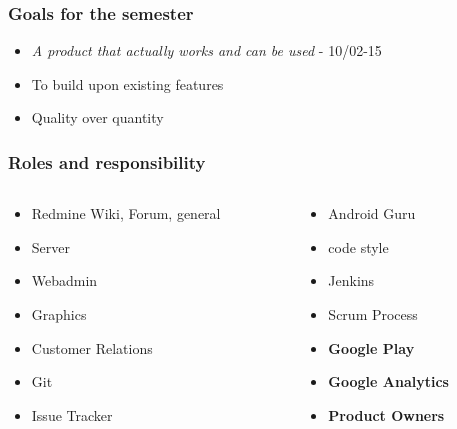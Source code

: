 \begin{frame}
	\begin{center}
		\frametitle{Goals for the semester}
		\begin{itemize}
			\item \textit{A product that actually works and can be used} - 10/02-15
			\item To build upon existing features
			\item Quality over quantity
		\end{itemize}
	\end{center}
\end{frame}

\begin{frame}
	\frametitle{Roles and responsibility}
	\begin{columns}[T] %
		\begin{column}{.48\textwidth}
			\begin{itemize}
				\item Redmine Wiki, Forum, general
				\item Server
				\item Webadmin
				\item Graphics
				\item Customer Relations
				\item Git
				\item Issue Tracker
			\end{itemize}
		\end{column}%
		\hfill%
		\begin{column}{.48\textwidth}
			\begin{itemize}
				\item Android Guru
				\item code style
				\item Jenkins
				\item Scrum Process
				\item \textbf{Google Play}
				\item \textbf{Google Analytics}
				\item \textbf{Product Owners}
			\end{itemize}
		\end{column}%
	\end{columns}
\end{frame}

